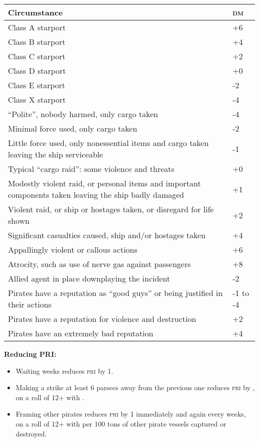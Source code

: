 \documentclass{cheatsheet}
\begin{document}
\begin{multicols}{2}
\begin{tabularx}{\linewidth}{Xl} \toprule
Circumstance & \textsc{dm} \\ \midrule
Class A starport & +6 \\
Class B starport & +4 \\
Class C starport & +2 \\
Class D starport & +0 \\
Class E starport & -2 \\
Class X starport & -4 \\
``Polite'', nobody harmed, only cargo taken & -4 \\
Minimal force used, only cargo taken & -2 \\
Little force used, only nonessential items and cargo taken leaving the ship serviceable & -1 \\
Typical ``cargo raid'': some violence and threats & +0 \\
Modestly violent raid, or personal items and important components taken leaving the ship badly damaged & +1 \\
Violent raid, or ship or hostages taken, or disregard for life shown & +2 \\
Significant casualties caused, ship and/or hostages taken & +4 \\
Appallingly violent or callous actions & +6 \\
Atrocity, such as use of nerve gas against passengers & +8 \\
Allied agent in place downplaying the incident & -2 \\
Pirates have a reputation as ``good guys'' or being justified in their actions & -1 to -4 \\
Pirates have a reputation for violence and destruction & +2 \\
Pirates have an extremely bad reputation & +4 \\ \bottomrule
\end{tabularx}

\textbf{Reducing PRI:}

\begin{itemize}
\item Waiting  weeks reduces \textsc{pri} by 1.
\item Making a strike at least 6 parsecs away from the previous one
  reduces \textsc{pri} by , on a roll of 12+ with .
\item Framing other pirates reduces \textsc{pri} by 1 immediately and
  again every  weeks, on a roll of 12+ with  per
  100 tons of other pirate vessels captured or destroyed.
\end{itemize}


\end{multicols}
\end{document}
